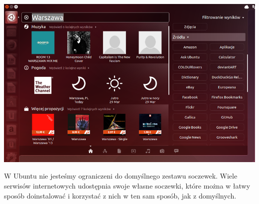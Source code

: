 \begin{center}
	\includegraphics[width=\linewidth]{images/unity_dash_wyszukiwanie3.png}
\end{center}

W Ubuntu nie jesteśmy ograniczeni do domyślnego zestawu soczewek. Wiele serwisów internetowych udostępnia swoje własne soczewki, które można w łatwy sposób doinstalować i korzystać z nich w ten sam sposób, jak z domyślnych.
